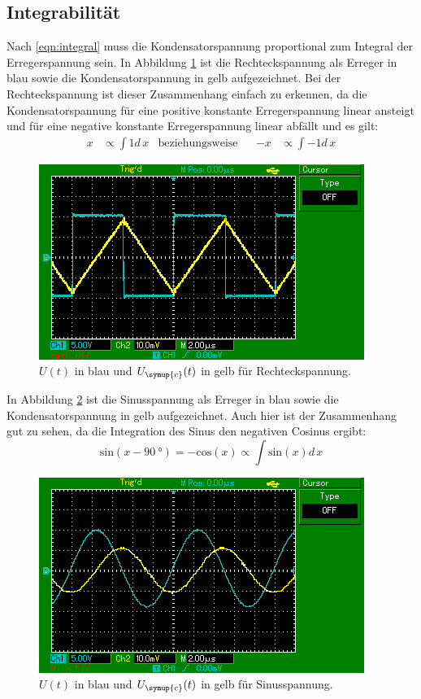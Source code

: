 \subsection{Integrabilität}
Nach \eqref{eqn:integral} muss die Kondensatorspannung proportional zum
Integral der Erregerspannung sein. In Abbildung \ref{fig:int_recht}
ist die Rechteckspannung als Erreger in blau sowie die
Kondensatorspannung in gelb aufgezeichnet. Bei der Rechteckspannung ist dieser
Zusammenhang einfach zu erkennen, da die Kondensatorspannung für eine
positive konstante Erregerspannung linear ansteigt und für eine
negative konstante Erregerspannung linear abfällt und es gilt:
\begin{align}
  x &\propto \int 1 d\, x &\text{beziehungsweise}&& -x &\propto \int -1 d\, x
\end{align}
\begin{figure}[H]
  \centering
  \includegraphics{content/images/d/rechteck.png}
  \caption{$U(t)$ in blau und $U_{\symup{c}}(t)$ in gelb für Rechteckspannung.}
  \label{fig:int_recht}
\end{figure}
In Abbildung \ref{fig:int_sin}
ist die Sinusspannung als Erreger in blau sowie die
Kondensatorspannung in gelb aufgezeichnet. Auch hier ist der Zusammenhang
gut zu sehen, da die Integration des Sinus den negativen Cosinus ergibt:
\begin{equation}
  \text{sin}(x-\SI{90}{\degree})=-\text{cos}(x) \propto \int \text{sin}(x)d\, x
\end{equation}
\begin{figure}[H]
  \centering
  \includegraphics{content/images/d/sinus.png}
  \caption{$U(t)$ in blau und $U_{\symup{c}}(t)$ in gelb für Sinusspannung.}
  \label{fig:int_sin}
\end{figure}

